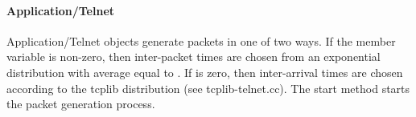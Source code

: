 \paragraph{Application/Telnet} 
Application/Telnet objects generate packets in one of two ways.
If the member variable  is non-zero,
then inter-packet times are chosen
from an exponential distribution with average equal to .
If  is zero, then inter-arrival times are chosen
according to the tcplib distribution (see tcplib-telnet.cc).
The start method starts the packet generation process.
 
\endinput
